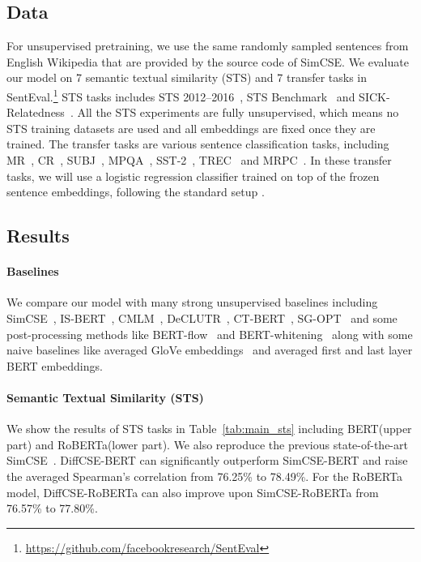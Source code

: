 \documentclass[11pt]{article}
\newcommand{\diffcse}{DiffCSE\xspace}
\newcommand{\ba}{\xspace}
\begin{document}
\subsection{Data}
For unsupervised pretraining, we use the same  randomly sampled sentences from English Wikipedia that are provided by the source code of SimCSE.
We evaluate our model on 7 semantic textual similarity (STS) and 7 transfer tasks in SentEval.\footnote{\scriptsize\url{https://github.com/facebookresearch/SentEval}} STS tasks includes STS 2012--2016~\cite{agirre-etal-2016-semeval},
STS Benchmark~\cite{cer-etal-2017-semeval} and
SICK-Relatedness~\cite{marelli2014sick}.
All the STS experiments are fully unsupervised, which means no STS training datasets are used and all embeddings are fixed once they are trained. 
The transfer tasks are various sentence classification tasks, including MR~\cite{pang2005seeing}, CR~\cite{hu2004mining}, SUBJ~\cite{pang2004sentimental}, MPQA~\cite{wiebe2005annotating}, SST-2~\cite{socher2013recursive}, TREC~\cite{voorhees2000building} and MRPC~\cite{dolan2005automatically}.
In these transfer tasks, we will use a logistic regression classifier trained on top of the frozen sentence embeddings, following the standard setup \cite{conneau-kiela-2018-senteval}.


\subsection{Results}

\paragraph{Baselines} We compare our model with many strong unsupervised baselines including SimCSE~\cite{gao2021simcse}, IS-BERT~\cite{zhang2020unsupervised}, CMLM~\cite{yang2020universal}, DeCLUTR~\cite{giorgi2020declutr}, CT-BERT~\cite{carlsson2021semantic}, SG-OPT~\cite{kim2021self} and some post-processing methods like BERT-flow~\cite{li-etal-2020-sentence} and BERT-whitening~\cite{su2021whitening} along with some naive baselines like averaged GloVe embeddings~\cite{pennington2014glove} and averaged first and last layer BERT embeddings.

\paragraph{Semantic Textual Similarity (STS)}
We show the results of STS tasks in Table~\ref{tab:main_sts} including BERT\ba (upper part) and RoBERTa\ba (lower part). We also reproduce the previous state-of-the-art SimCSE~\cite{gao2021simcse}. \diffcse-BERT\ba can significantly outperform SimCSE-BERT\ba and raise the averaged Spearman’s correlation from 76.25\% to 78.49\%. 
For the RoBERTa model, \diffcse-RoBERTa\ba can also improve upon SimCSE-RoBERTa\ba from 76.57\% to 77.80\%.
\end{document}
